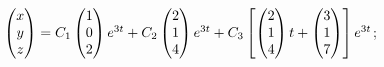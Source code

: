 \begin{enumsolsfull}
		\item \( \begin{pmatrix} x \\ y \\ z \end{pmatrix} = C_1 \begin{pmatrix} 1 \\ 0 \\ 2 \end{pmatrix} e^{3t} + C_2 \begin{pmatrix} 2 \\ 1 \\ 4 \end{pmatrix} e^{3t} + C_3 \left[ \begin{pmatrix} 2 \\ 1 \\ 4 \end{pmatrix} t + \begin{pmatrix} 3 \\ 1 \\ 7 \end{pmatrix} \right] e^{3t} \); %

\end{enumsolsfull}
